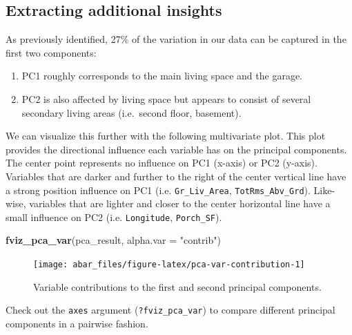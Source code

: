\documentclass[]{book}
\newenvironment{Shaded}{\begin{snugshade}}{\end{snugshade}}
\newcommand{\DataTypeTok}[1]{\textcolor[rgb]{0.13,0.29,0.53}{#1}}
\newcommand{\KeywordTok}[1]{\textcolor[rgb]{0.13,0.29,0.53}{\textbf{#1}}}
\newcommand{\NormalTok}[1]{#1}
\newcommand{\StringTok}[1]{\textcolor[rgb]{0.31,0.60,0.02}{#1}}
\providecommand{\tightlist}{%
  \setlength{\itemsep}{0pt}\setlength{\parskip}{0pt}}
\theoremstyle{definition}
\theoremstyle{definition}
\theoremstyle{definition}
\theoremstyle{remark}
\let\BeginKnitrBlock\begin \let\EndKnitrBlock\end
\begin{document}
\hypertarget{extracting-additional-insights}{%
\subsection{Extracting additional
insights}\label{extracting-additional-insights}}

As previously identified, 27\% of the variation in our data can be
captured in the first two components:

\begin{enumerate}
\def\labelenumi{\arabic{enumi}.}
\tightlist
\item
  PC1 roughly corresponds to the main living space and the garage.
\item
  PC2 is also affected by living space but appears to consist of several
  secondary living areas (i.e.~second floor, basement).
\end{enumerate}

We can visualize this further with the following multivariate plot. This
plot provides the directional influence each variable has on the
principal components. The center point represents no influence on PC1
(x-axis) or PC2 (y-axis). Variables that are darker and further to the
right of the center vertical line have a strong position influence on
PC1 (i.e. \texttt{Gr\_Liv\_Area}, \texttt{TotRms\_Abv\_Grd}). Like-wise,
variables that are lighter and closer to the center horizontal line have
a small influence on PC2 (i.e. \texttt{Longitude}, \texttt{Porch\_SF}).

\begin{Shaded}
\begin{Highlighting}[]
\KeywordTok{fviz_pca_var}\NormalTok{(pca_result, }\DataTypeTok{alpha.var =} \StringTok{"contrib"}\NormalTok{)}
\end{Highlighting}
\end{Shaded}

\begin{figure}

{\centering \texttt{[image: abar\_files/figure-latex/pca-var-contribution-1]} 

}

\caption{Variable contributions to the first and second principal components.}\label{fig:pca-var-contribution}
\end{figure}

\BeginKnitrBlock{note}
Check out the \texttt{axes} argument (\texttt{?fviz\_pca\_var}) to
compare different principal components in a pairwise fashion.
\EndKnitrBlock{note}
\end{document}
